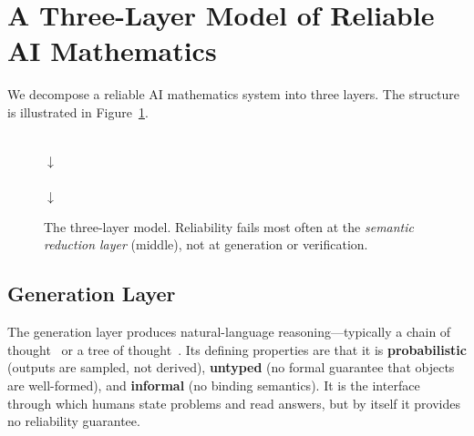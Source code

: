 \documentclass[11pt]{article}
\begin{document}
\section{A Three-Layer Model of Reliable AI Mathematics}
\label{sec:model}

We decompose a reliable AI mathematics system into three layers. The structure is
illustrated in Figure~\ref{fig:layers}.

\begin{figure}[t]
\centering
{}
\\[5pt] $\downarrow$ \\[5pt]
\\[5pt] $\downarrow$ \\[5pt]
\caption{The three-layer model. Reliability fails most often at the \emph{semantic
reduction layer} (middle), not at generation or verification.}
\label{fig:layers}
\end{figure}

\subsection{Generation Layer}
\label{sec:gen}
The generation layer produces natural-language reasoning---typically a chain of
thought~\cite{wei2022chain} or a tree of thought~\cite{yao2023tree}. Its defining
properties are that it is \textbf{probabilistic} (outputs are sampled, not derived),
\textbf{untyped} (no formal guarantee that objects are well-formed), and
\textbf{informal} (no binding semantics). It is the interface through which humans
state problems and read answers, but by itself it provides no reliability guarantee.
\end{document}
